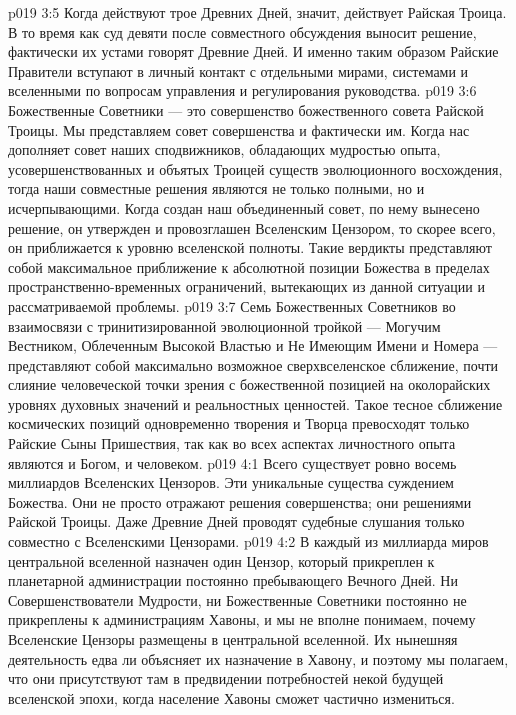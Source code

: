 \vs p019 3:5 Когда действуют трое Древних Дней, значит, действует Райская Троица. В то время как суд девяти после совместного обсуждения выносит решение, фактически их устами говорят Древние Дней. И именно таким образом Райские Правители вступают в личный контакт с отдельными мирами, системами и вселенными по вопросам управления и регулирования руководства.
\vs p019 3:6 \pc Божественные Советники --- это совершенство божественного совета Райской Троицы. Мы представляем совет совершенства и фактически  им. Когда нас дополняет совет наших сподвижников, обладающих мудростью опыта, усовершенствованных и объятых Троицей существ эволюционного восхождения, тогда наши совместные решения являются не только полными, но и исчерпывающими. Когда создан наш объединенный совет, по нему вынесено решение, он утвержден и провозглашен Вселенским Цензором, то скорее всего, он приближается к уровню вселенской полноты. Такие вердикты представляют собой максимальное приближение к абсолютной позиции Божества в пределах пространственно\hyp{}временных ограничений, вытекающих из данной ситуации и рассматриваемой проблемы.
\vs p019 3:7 Семь Божественных Советников во взаимосвязи с тринитизированной эволюционной тройкой --- Могучим Вестником, Облеченным Высокой Властью и Не Имеющим Имени и Номера --- представляют собой максимально возможное сверхвселенское сближение, почти слияние человеческой точки зрения с божественной позицией на околорайских уровнях духовных значений и реальностных ценностей. Такое тесное сближение космических позиций одновременно творения и Творца превосходят только Райские Сыны Пришествия, так как во всех аспектах личностного опыта являются и Богом, и человеком.
\vs p019 4:1 Всего существует ровно восемь миллиардов Вселенских Цензоров. Эти уникальные существа  суждением Божества. Они не просто отражают решения совершенства; они  решениями Райской Троицы. Даже Древние Дней проводят судебные слушания только совместно с Вселенскими Цензорами.
\vs p019 4:2 В каждый из миллиарда миров центральной вселенной назначен один Цензор, который прикреплен к планетарной администрации постоянно пребывающего Вечного Дней. Ни Совершенствователи Мудрости, ни Божественные Советники постоянно не прикреплены к администрациям Хавоны, и мы не вполне понимаем, почему Вселенские Цензоры размещены в центральной вселенной. Их нынешняя деятельность едва ли объясняет их назначение в Хавону, и поэтому мы полагаем, что они присутствуют там в предвидении потребностей некой будущей вселенской эпохи, когда население Хавоны сможет частично измениться.
